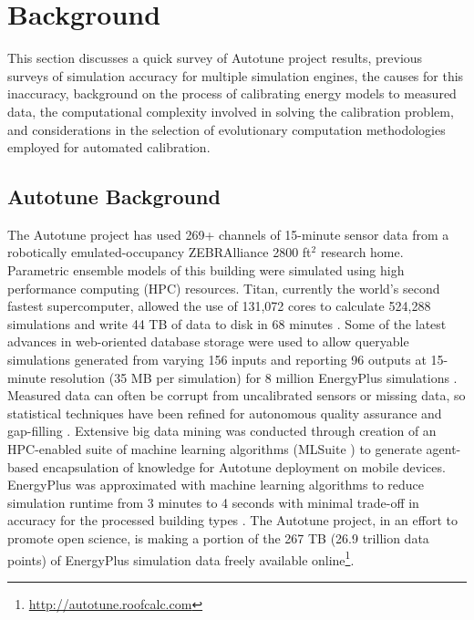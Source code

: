 \documentclass[preprint, review, 12pt]{elsarticle}
\begin{document}
\section{Background}
\label{sec:background}
This section discusses a quick survey of Autotune project results, previous surveys of simulation accuracy for multiple simulation engines, the causes for this inaccuracy, background on the process of calibrating energy models to measured data, the computational complexity involved in solving the calibration problem, and considerations in the selection of evolutionary computation methodologies employed for automated calibration.

\subsection{Autotune Background}
The Autotune project has used 269+ channels of 15-minute sensor data from a robotically emulated-occupancy ZEBRAlliance \cite{cit:miller2012,cit:biswas2012} 2800 ft$^2$ research home. Parametric ensemble models of this building were simulated using high performance computing (HPC) resources. Titan, currently the world’s second fastest supercomputer, allowed the use of 131,072 cores to calculate 524,288 simulations and write 44 TB of data to disk in 68 minutes \cite{cit:sanyal2013a}. Some of the latest advances in web-oriented database storage were used to allow queryable simulations generated from varying 156 inputs and reporting 96 outputs at 15-minute resolution (35 MB per simulation) for 8 million EnergyPlus simulations \cite{cit:sanyal2013b}. Measured data can often be corrupt from uncalibrated sensors or missing data, so statistical techniques have been refined for autonomous quality assurance and gap-filling \cite{cit:castello2012}. Extensive big data mining was conducted through creation of an HPC-enabled suite of machine learning algorithms (MLSuite \cite{cit:edwards2013}) to generate agent-based encapsulation of knowledge for Autotune deployment on mobile devices. EnergyPlus was approximated with machine learning algorithms to reduce simulation runtime from 3 minutes to 4 seconds with minimal trade-off in accuracy for the processed building types \cite{cit:edwards2013}. The Autotune project, in an effort to promote open science, is making a portion of the 267 TB (26.9 trillion data points) of EnergyPlus simulation data freely available online\footnote{\url{http://autotune.roofcalc.com}}.
\end{document}
